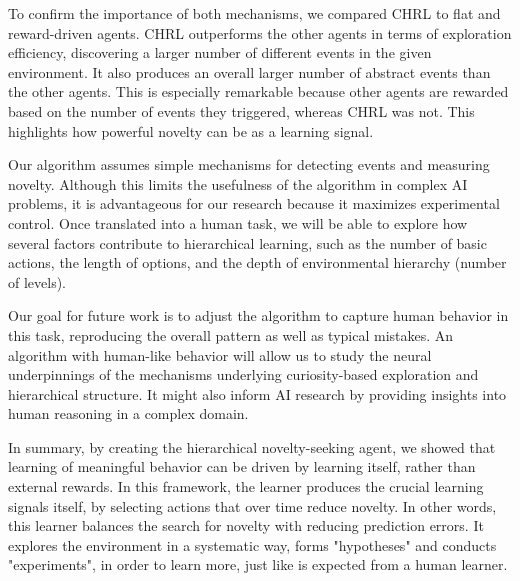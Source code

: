 \documentclass{article}
\begin{document}
To confirm the importance of both mechanisms, we compared CHRL to flat and reward-driven agents. CHRL outperforms the other agents in terms of exploration efficiency, discovering a larger number of different events in the given environment. It also produces an overall larger number of abstract events than the other agents. This is especially remarkable because other agents are rewarded based on the number of events they triggered, whereas CHRL was not. This highlights how powerful novelty can be as a learning signal.


Our algorithm assumes simple mechanisms for detecting events and measuring novelty. Although this limits the usefulness of the algorithm in complex AI problems, it is advantageous for our research because it maximizes experimental control. Once translated into a human task, we will be able to explore how several factors contribute to hierarchical learning, such as the number of basic actions, the length of options, and the depth of environmental hierarchy (number of levels). 

Our goal for future work is to adjust the algorithm to capture human behavior in this task, reproducing the overall pattern as well as typical mistakes. An algorithm with human-like behavior will allow us to study the neural underpinnings of the mechanisms underlying curiosity-based exploration and hierarchical structure. It might also inform AI research by providing insights into human reasoning in a complex domain.

In summary, by creating the hierarchical novelty-seeking agent, we showed that learning of meaningful behavior can be driven by learning itself, rather than external rewards. In this framework, the learner produces the crucial learning signals itself, by selecting actions that over time reduce novelty. In other words, this learner balances the search for novelty with reducing prediction errors. It explores the environment in a systematic way, forms "hypotheses" and conducts "experiments", in order to learn more, just like is expected from a human learner.

\printbibliography
\end{document}
